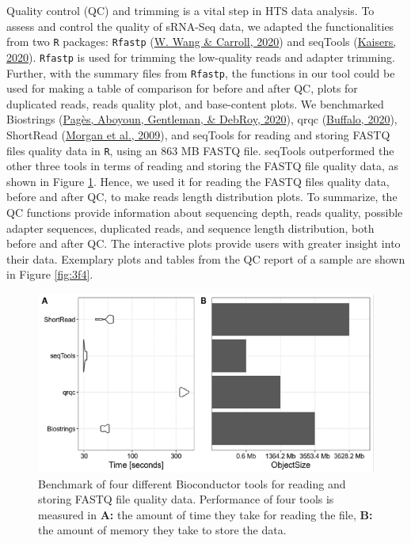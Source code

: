 \documentclass[12pt,twoside]{reedthesis}
\begin{document}
Quality control (QC) and trimming is a vital step in HTS data analysis.
To assess and control the quality of sRNA-Seq data, we adapted the
functionalities from two \texttt{R} packages: \texttt{Rfastp} (\protect\hyperlink{ref-wang2020}{W. Wang \& Carroll, 2020}) and seqTools
(\protect\hyperlink{ref-kaisers2020}{Kaisers, 2020}). \texttt{Rfastp} is used for trimming the low-quality reads and
adapter trimming. Further, with the summary files from \texttt{Rfastp}, the
functions in our tool could be used for making a table of comparison for
before and after QC, plots for duplicated reads, reads quality plot, and
base-content plots. We benchmarked Biostrings (\protect\hyperlink{ref-paguxe8s2020}{Pagès, Aboyoun, Gentleman, \& DebRoy, 2020}), qrqc
(\protect\hyperlink{ref-buffalo2020}{Buffalo, 2020}), ShortRead (\protect\hyperlink{ref-morgan2009}{Morgan et al., 2009}), and seqTools for reading and
storing FASTQ files quality data in \texttt{R}, using an 863 MB FASTQ file.
seqTools outperformed the other three tools in terms of reading and
storing the FASTQ file quality data, as shown in Figure \ref{fig:3f3}. Hence, we
used it for reading the FASTQ files quality data, before and after QC,
to make reads length distribution plots. To summarize, the QC functions
provide information about sequencing depth, reads quality, possible
adapter sequences, duplicated reads, and sequence length distribution,
both before and after QC. The interactive plots provide users with
greater insight into their data. Exemplary plots and tables from the QC
report of a sample are shown in Figure \ref{fig:3f4}.


\begin{figure}[htbp]

{\centering \includegraphics{thesis_files/figure-latex/3f3-1} 

}

\caption{Benchmark of four different Bioconductor tools for reading and storing FASTQ file quality data. Performance of four tools is measured in \textbf{A:} the amount of time they take for reading the file, \textbf{B:} the amount of memory they take to store the data.}\label{fig:3f3}
\end{figure}
\end{document}
